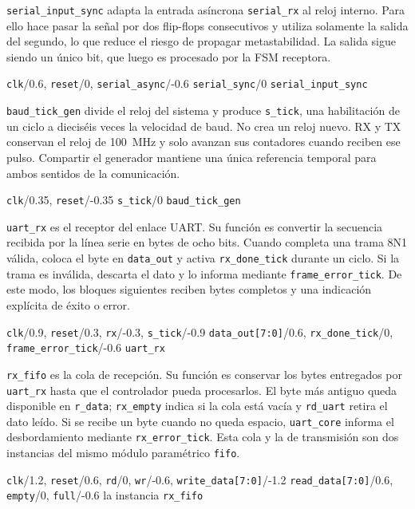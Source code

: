 \texttt{serial\_input\_sync} adapta la entrada asíncrona
\texttt{serial\_rx} al reloj interno. Para ello hace pasar la señal por dos
flip-flops consecutivos y utiliza solamente la salida del segundo, lo que reduce
el riesgo de propagar metastabilidad. La salida sigue siendo un único bit, que
luego es procesado por la FSM receptora.

{{\texttt{clk}}/0.6,
  {\texttt{reset}}/0,
{\texttt{serial\_async}}/-0.6}
{{\texttt{serial\_sync}}/0}
{\texttt{serial\_input\_sync}}

\texttt{baud\_tick\_gen} divide el reloj del sistema y produce
\texttt{s\_tick}, una habilitación de un ciclo a dieciséis veces la velocidad de
baud. No crea un reloj nuevo. RX y TX conservan el reloj de
\SI{100}{\mega\hertz}
y solo avanzan sus contadores cuando reciben ese pulso. Compartir el generador
mantiene una única referencia temporal para ambos sentidos de la comunicación.

{{\texttt{clk}}/0.35,
{\texttt{reset}}/-0.35}
{{\texttt{s\_tick}}/0}
{\texttt{baud\_tick\_gen}}

\texttt{uart\_rx} es el receptor del enlace UART. Su función es convertir la
secuencia recibida por la línea serie en bytes de ocho bits. Cuando completa una
trama 8N1 válida, coloca el byte en
\texttt{data\_out} y activa \texttt{rx\_done\_tick} durante un ciclo.
Si la trama
es inválida, descarta el dato y lo informa mediante
\texttt{frame\_error\_tick}. De este modo, los bloques siguientes reciben bytes
completos y una indicación explícita de éxito o error.

{{\texttt{clk}}/0.9,
  {\texttt{reset}}/0.3,
  {\texttt{rx}}/-0.3,
{\texttt{s\_tick}}/-0.9}
{{\texttt{data\_out[7:0]}}/0.6,
  {\texttt{rx\_done\_tick}}/0,
{\texttt{frame\_error\_tick}}/-0.6}
{\texttt{uart\_rx}}

\texttt{rx\_fifo} es la cola de recepción. Su función es conservar los bytes
entregados por \texttt{uart\_rx} hasta que el controlador pueda procesarlos. El
byte más antiguo queda disponible en \texttt{r\_data};
\texttt{rx\_empty} indica si la cola está vacía y \texttt{rd\_uart} retira el
dato leído. Si se recibe un byte cuando no queda espacio, \texttt{uart\_core}
informa el desbordamiento mediante \texttt{rx\_error\_tick}. Esta cola y la de
transmisión son dos instancias del mismo módulo paramétrico \texttt{fifo}.

{{\texttt{clk}}/1.2,
  {\texttt{reset}}/0.6,
  {\texttt{rd}}/0,
  {\texttt{wr}}/-0.6,
{\texttt{write\_data[7:0]}}/-1.2}
{{\texttt{read\_data[7:0]}}/0.6,
  {\texttt{empty}}/0,
{\texttt{full}}/-0.6}
{la instancia \texttt{rx\_fifo}}

